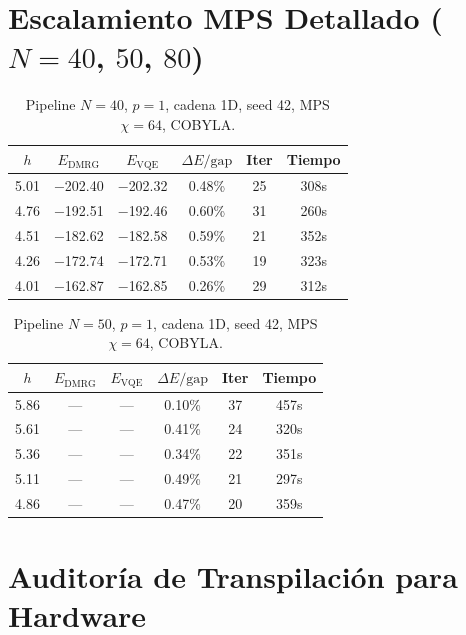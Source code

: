 \documentclass[11pt,a4paper,spanish]{book}
\begin{document}
\section{Escalamiento MPS Detallado ($N = 40$, $50$, $80$)}

\begin{table}[h]
\centering
\caption{Pipeline $N = 40$, $p = 1$, cadena 1D, seed 42, MPS $\chi = 64$, COBYLA.}
\label{tab:app_n40}
\begin{tabular}{cccccc}
\toprule
\textbf{$h$} & \textbf{$E_{\text{DMRG}}$} & \textbf{$E_{\text{VQE}}$} & \textbf{$\Delta E/\text{gap}$} & \textbf{Iter} & \textbf{Tiempo} \\
\midrule
5.01 & $-$202.40 & $-$202.32 & 0.48\% & 25 & 308s \\
4.76 & $-$192.51 & $-$192.46 & 0.60\% & 31 & 260s \\
4.51 & $-$182.62 & $-$182.58 & 0.59\% & 21 & 352s \\
4.26 & $-$172.74 & $-$172.71 & 0.53\% & 19 & 323s \\
4.01 & $-$162.87 & $-$162.85 & 0.26\% & 29 & 312s \\
\bottomrule
\end{tabular}
\end{table}

\begin{table}[h]
\centering
\caption{Pipeline $N = 50$, $p = 1$, cadena 1D, seed 42, MPS $\chi = 64$, COBYLA.}
\label{tab:app_n50}
\begin{tabular}{cccccc}
\toprule
\textbf{$h$} & \textbf{$E_{\text{DMRG}}$} & \textbf{$E_{\text{VQE}}$} & \textbf{$\Delta E/\text{gap}$} & \textbf{Iter} & \textbf{Tiempo} \\
\midrule
5.86 & — & — & 0.10\% & 37 & 457s \\
5.61 & — & — & 0.41\% & 24 & 320s \\
5.36 & — & — & 0.34\% & 22 & 351s \\
5.11 & — & — & 0.49\% & 21 & 297s \\
4.86 & — & — & 0.47\% & 20 & 359s \\
\bottomrule
\end{tabular}
\end{table}

\section{Auditoría de Transpilación para Hardware}
\end{document}
